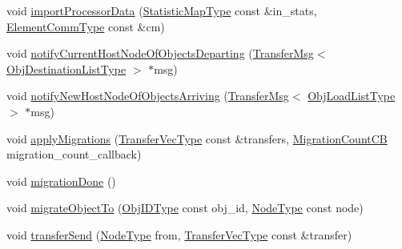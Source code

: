 \begin{DoxyCompactItemize}
\item 
void \hyperlink{structvt_1_1vrt_1_1collection_1_1lb_1_1_base_l_b_a132d99e0b3e36e57c5d8018f3d07d8b1}{import\+Processor\+Data} (\hyperlink{structvt_1_1vrt_1_1collection_1_1lb_1_1_base_l_b_acd9bdad961ac83c96b7a227de672f96c}{Statistic\+Map\+Type} const \&in\+\_\+stats, \hyperlink{structvt_1_1vrt_1_1collection_1_1lb_1_1_base_l_b_a83eb4daec14edfb8780422e95b8e38d3}{Element\+Comm\+Type} const \&cm)
\item 
void \hyperlink{structvt_1_1vrt_1_1collection_1_1lb_1_1_base_l_b_a0f3cd0272069ff5fb31d6539c567efeb}{notify\+Current\+Host\+Node\+Of\+Objects\+Departing} (\hyperlink{structvt_1_1vrt_1_1collection_1_1lb_1_1_transfer_msg}{Transfer\+Msg}$<$ \hyperlink{structvt_1_1vrt_1_1collection_1_1lb_1_1_base_l_b_ad50ba1022c6beeb6e9187a8f1a3e16fe}{Obj\+Destination\+List\+Type} $>$ $\ast$msg)
\item 
void \hyperlink{structvt_1_1vrt_1_1collection_1_1lb_1_1_base_l_b_a2bab9ccb4d2378b3915b03c79d5b18c2}{notify\+New\+Host\+Node\+Of\+Objects\+Arriving} (\hyperlink{structvt_1_1vrt_1_1collection_1_1lb_1_1_transfer_msg}{Transfer\+Msg}$<$ \hyperlink{structvt_1_1vrt_1_1collection_1_1lb_1_1_base_l_b_ae07370140db06e363398914895c5c728}{Obj\+Load\+List\+Type} $>$ $\ast$msg)
\item 
void \hyperlink{structvt_1_1vrt_1_1collection_1_1lb_1_1_base_l_b_aa19210106d6f44ea03b446c7f6a92cb1}{apply\+Migrations} (\hyperlink{structvt_1_1vrt_1_1collection_1_1lb_1_1_base_l_b_a329e8179ec41a1bd4924c79fe23a79af}{Transfer\+Vec\+Type} const \&transfers, \hyperlink{structvt_1_1vrt_1_1collection_1_1lb_1_1_base_l_b_aba7198eb30aef1b19c1f1efdea760543}{Migration\+Count\+CB} migration\+\_\+count\+\_\+callback)
\item 
void \hyperlink{structvt_1_1vrt_1_1collection_1_1lb_1_1_base_l_b_ac8ed2cc09aec1f84e179ba734da71960}{migration\+Done} ()
\item 
void \hyperlink{structvt_1_1vrt_1_1collection_1_1lb_1_1_base_l_b_a952846044ca0d13d25ca828b84112d0e}{migrate\+Object\+To} (\hyperlink{structvt_1_1vrt_1_1collection_1_1lb_1_1_base_l_b_a790b22acf448880599724749cdc4e9b3}{Obj\+I\+D\+Type} const obj\+\_\+id, \hyperlink{namespacevt_a866da9d0efc19c0a1ce79e9e492f47e2}{Node\+Type} const node)
\item 
void \hyperlink{structvt_1_1vrt_1_1collection_1_1lb_1_1_base_l_b_af8d95bc056659de7121bca99ce2d9d73}{transfer\+Send} (\hyperlink{namespacevt_a866da9d0efc19c0a1ce79e9e492f47e2}{Node\+Type} from, \hyperlink{structvt_1_1vrt_1_1collection_1_1lb_1_1_base_l_b_a329e8179ec41a1bd4924c79fe23a79af}{Transfer\+Vec\+Type} const \&transfer)

\end{DoxyCompactItemize}
